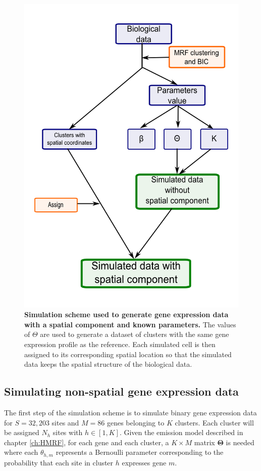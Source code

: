 	\begin{figure}[H]
\centerline{\includegraphics[width=0.8\linewidth]{gfx/chapter5/simulation_scheme.png}}
\caption{{\bf Simulation scheme used to generate gene expression data with a spatial component and known parameters.} The values of $\Theta$ are used to generate a dataset of clusters with the same gene expression profile as the reference. Each simulated cell is then assigned to its corresponding spatial location so that the simulated data keeps the spatial structure of the biological data.}
\label{fig:simulationScheme}
	\end{figure}
	
	\subsection{Simulating non-spatial gene expression data}\label{subsec:simul_non_spatial}
	The first step of the simulation scheme is to simulate binary gene expression data for $S=32,203$ sites and $M=86$ genes belonging to $K$ clusters. Each cluster will be assigned $N_h$ sites with $h \in [1,K]$. Given the emission model described in chapter \ref{ch:HMRF}, for each gene and each cluster, a $K \times M$ matrix $\boldsymbol{\Theta}$ is needed where each $\theta_{h,m}$ represents a Bernoulli parameter corresponding to the probability that each site in cluster $h$ expresses gene $m$.\\
	
